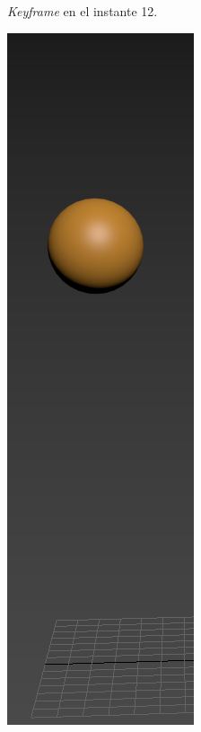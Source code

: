 \documentclass{article}
\begin{document}
\begin{figure}[H]
\begin{subfigure}[H]{0.15\textwidth}
	    \caption{\textit{Keyframe} en el instante 12.}
	\end{subfigure}
    \hfill
	\begin{subfigure}[H]{0.15\textwidth}
	    \centering
	    \includegraphics[width=\textwidth]{imagenes/Ejercicio 2/p1_18.png}

\end{subfigure}
\end{figure}
\end{document}
